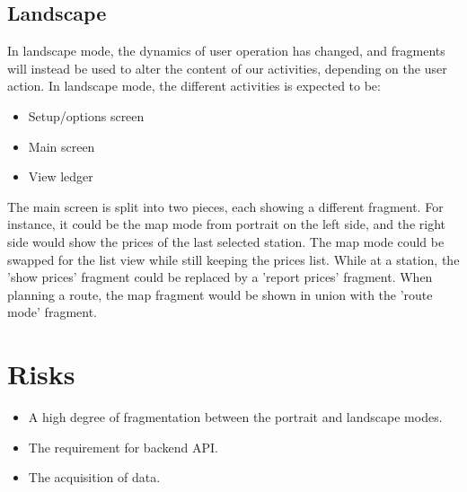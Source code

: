 \subsection{Landscape}
In landscape mode, the dynamics of user operation has changed, and fragments will instead be used to alter the content of our activities, depending on the user action. In landscape mode, the different activities is expected to be:
\begin{itemize}
	\item Setup/options screen
	\item Main screen
	\item View ledger
\end{itemize}

The main screen is split into two pieces, each showing a different fragment. For instance, it could be the map mode from portrait on the left side, and the right side would show the prices of the last selected station. The map mode could be swapped for the list view while still keeping the prices list. While at a station, the 'show prices' fragment could be replaced by a 'report prices' fragment. When planning a route, the map fragment would be shown in union with the 'route mode' fragment.

\section{Risks}
\begin{itemize}
	\item A high degree of fragmentation between the portrait and landscape modes.
	\item The requirement for backend API.
	\item The acquisition of data.
\end{itemize}
